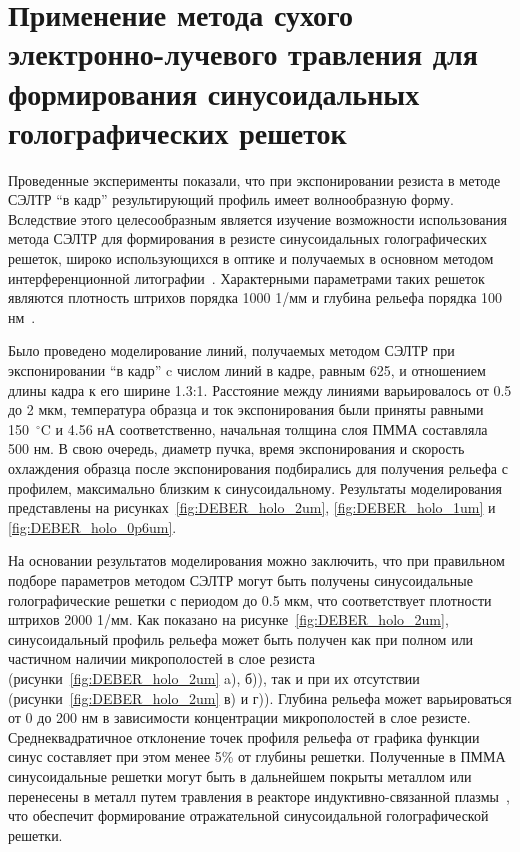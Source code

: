 \section{Применение метода сухого электронно-лучевого травления для формирования синусоидальных голографических решеток}

Проведенные эксперименты показали, что при экспонировании резиста в методе СЭЛТР ``в кадр'' результирующий профиль имеет волнообразную форму. Вследствие этого целесообразным является изучение возможности использования метода СЭЛТР для формирования в резисте синусоидальных голографических решеток, широко использующихся в оптике и получаемых в основном методом интерференционной литографии~\cite{Harrison2004_sin_gratings, Tishchenko2017_sin_gratings}. Характерными параметрами таких решеток являются плотность штрихов порядка 1000 1/мм и глубина рельефа порядка 100 нм~\cite{Harvey2020_diffraction_gratings}.

Было проведено моделирование линий, получаемых методом СЭЛТР при экспонировании ``в кадр'' c числом линий в кадре, равным 625, и отношением длины кадра к его ширине 1.3:1. Расстояние между линиями варьировалось от 0.5 до 2 мкм, температура образца и ток экспонирования были приняты равными 150~$^\circ$C и 4.56 нА соответственно, начальная толщина слоя ПММА составляла 500 нм. В свою очередь, диаметр пучка, время экспонирования и скорость охлаждения образца после экспонирования подбирались для получения рельефа с профилем, максимально близким к синусоидальному. Результаты моделирования представлены на рисунках~\ref{fig:DEBER_holo_2um}, \ref{fig:DEBER_holo_1um} и \ref{fig:DEBER_holo_0p6um}.

На основании результатов моделирования можно заключить, что при правильном подборе параметров методом СЭЛТР могут быть получены синусоидальные голографические решетки с периодом до 0.5 мкм, что соответствует плотности штрихов 2000 1/мм. Как показано на рисунке~\ref{fig:DEBER_holo_2um}, синусоидальный профиль рельефа может быть получен как при полном или частичном наличии микрополостей в слое резиста (рисунки~\ref{fig:DEBER_holo_2um} a), б)), так и при их отсутствии (рисунки~\ref{fig:DEBER_holo_2um} в) и г)). Глубина рельефа может варьироваться от 0 до 200 нм в зависимости концентрации микрополостей в слое резисте. Среднеквадратичное отклонение точек профиля рельефа от графика функции синус составляет при этом менее 5\% от глубины решетки. Полученные в ПММА синусоидальные решетки могут быть в дальнейшем покрыты металлом или перенесены в металл путем травления в реакторе индуктивно-связанной плазмы~\cite{Bruk_2016_mee}, что обеспечит формирование отражательной синусоидальной голографической решетки.

